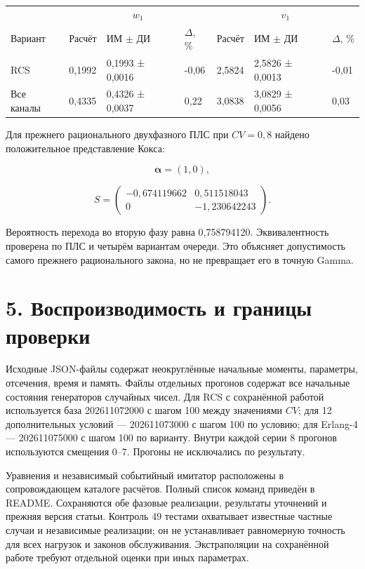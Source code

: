 \setlength{\tabcolsep}{2pt}
\begin{tabular}{p{4.16cm}p{1.61cm}p{2.83cm}p{1.28cm}p{1.61cm}p{2.83cm}p{1.28cm}}
\toprule
 & \multicolumn{3}{c}{$w_1$} & \multicolumn{3}{c}{$v_1$} \\
Вариант & Расчёт & ИМ $\pm$ ДИ & $\Delta$, \% & Расчёт & ИМ $\pm$ ДИ & $\Delta$, \% \\
\midrule
RCS & 0,1992 & 0,1993 ± 0,0016 & -0,06 & 2,5824 & 2,5826 ± 0,0013 & -0,01 \\
Все каналы & 0,4335 & 0,4326 ± 0,0037 & 0,22 & 3,0838 & 3,0829 ± 0,0056 & 0,03 \\
\bottomrule
\end{tabular}




Для прежнего рационального двухфазного ПЛС при \(CV=0{,}8\) найдено положительное представление Кокса:


\[\boldsymbol\alpha=(1,0),\]

\[S=\begin{pmatrix}-0{,}674119662&0{,}511518043\\0&-1{,}230642243\end{pmatrix}.\]


Вероятность перехода во вторую фазу равна 0{,}758794120. Эквивалентность проверена по ПЛС и четырём вариантам очереди. Это объясняет допустимость самого прежнего рационального закона, но не превращает его в точную Gamma.

\section*{5. Воспроизводимость и границы проверки}
Исходные JSON-файлы содержат неокруглённые начальные моменты, параметры, отсечения, время и память. Файлы отдельных прогонов содержат все начальные состояния генераторов случайных чисел. Для RCS с сохранённой работой используется база 202611072000 с шагом 100 между значениями \(CV\); для 12 дополнительных условий --- 202611073000 с шагом 100 по условию; для Erlang-4 --- 202611075000 с шагом 100 по варианту. Внутри каждой серии 8 прогонов используются смещения 0--7. Прогоны не исключались по результату.

Уравнения и независимый событийный имитатор расположены в сопровождающем каталоге расчётов. Полный список команд приведён в README. Сохраняются обе фазовые реализации, результаты уточнений и прежняя версия статьи. Контроль 49 тестами охватывает известные частные случаи и независимые реализации; он не устанавливает равномерную точность для всех нагрузок и законов обслуживания. Экстраполяции на сохранённой работе требуют отдельной оценки при иных параметрах.

